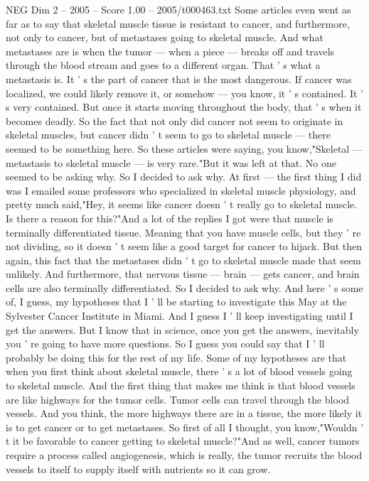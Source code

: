 \begin{textsample}{NEG Dim 2 – 2005 – Score 1.00 – 2005/t000463.txt}
Some articles even went as far as to say that skeletal muscle tissue is resistant to cancer, and furthermore, not only to cancer, but of metastases going to skeletal muscle.
And what metastases are is when the tumor — when a piece — breaks off and travels through the blood stream and goes to a different organ.
That ' s what a metastasis is.
It ' s the part of cancer that is the most dangerous.
If cancer was localized, we could likely remove it, or somehow — you know, it ' s contained.
It ' s very contained.
But once it starts moving throughout the body, that ' s when it becomes deadly.
So the fact that not only did cancer not seem to originate in skeletal muscles, but cancer didn ' t seem to go to skeletal muscle — there seemed to be something here.
So these articles were saying, you know,"Skeletal — metastasis to skeletal muscle — is very rare."But it was left at that.
No one seemed to be asking why.
So I decided to ask why.
At first — the first thing I did was I emailed some professors who specialized in skeletal muscle physiology, and pretty much said,"Hey, it seems like cancer doesn ' t really go to skeletal muscle.
Is there a reason for this?"And a lot of the replies I got were that muscle is terminally differentiated tissue.
Meaning that you have muscle cells, but they ' re not dividing, so it doesn ' t seem like a good target for cancer to hijack.
But then again, this fact that the metastases didn ' t go to skeletal muscle made that seem unlikely.
And furthermore, that nervous tissue — brain — gets cancer, and brain cells are also terminally differentiated.
So I decided to ask why.
And here ' s some of, I guess, my hypotheses that I ' ll be starting to investigate this May at the Sylvester Cancer Institute in Miami.
And I guess I ' ll keep investigating until I get the answers.
But I know that in science, once you get the answers, inevitably you ' re going to have more questions.
So I guess you could say that I ' ll probably be doing this for the rest of my life.
Some of my hypotheses are that when you first think about skeletal muscle, there ' s a lot of blood vessels going to skeletal muscle.
And the first thing that makes me think is that blood vessels are like highways for the tumor cells.
Tumor cells can travel through the blood vessels.
And you think, the more highways there are in a tissue, the more likely it is to get cancer or to get metastases.
So first of all I thought, you know,"Wouldn ' t it be favorable to cancer getting to skeletal muscle?"And as well, cancer tumors require a process called angiogenesis, which is really, the tumor recruits the blood vessels to itself to supply itself with nutrients so it can grow.

\end{textsample}
